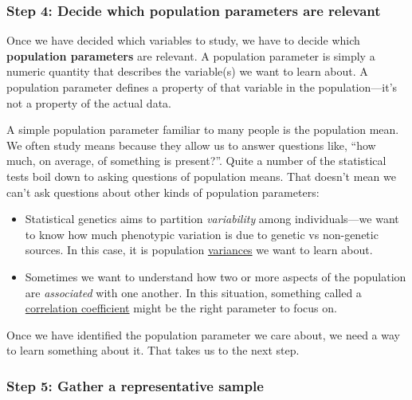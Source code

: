 \documentclass[
]{book}
\begin{document}
\hypertarget{step-4-decide-which-population-parameters-are-relevant}{%
\subsubsection*{Step 4: Decide which population parameters are relevant}\label{step-4-decide-which-population-parameters-are-relevant}}

Once we have decided which variables to study, we have to decide which \textbf{population parameters} are relevant. A population parameter is simply a numeric quantity that describes the variable(s) we want to learn about. A population parameter defines a property of that variable in the population---it's not a property of the actual data.

A simple population parameter familiar to many people is the population mean. We often study means because they allow us to answer questions like, ``how much, on average, of something is present?''. Quite a number of the statistical tests boil down to asking questions of population means. That doesn't mean we can't ask questions about other kinds of population parameters:

\begin{itemize}
\item
  Statistical genetics aims to partition \emph{variability} among individuals---we want to know how much phenotypic variation is due to genetic vs non-genetic sources. In this case, it is population \uline{variances} we want to learn about.
\item
  Sometimes we want to understand how two or more aspects of the population are \emph{associated} with one another. In this situation, something called a \uline{correlation coefficient} might be the right parameter to focus on.
\end{itemize}

Once we have identified the population parameter we care about, we need a way to learn something about it. That takes us to the next step.

\hypertarget{step-5-gather-a-representative-sample}{%
\subsubsection*{Step 5: Gather a representative sample}\label{step-5-gather-a-representative-sample}}
\end{document}
